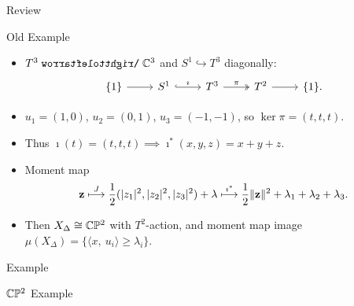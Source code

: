\begin{frame}[fragile]{Review}
    \begin{block}{Old Example}
        \begin{itemize}
            \item $T^{3} \acts \CC^{3}$ and $S^{1} \hookrightarrow T^{3}$ diagonally:
            \[
            \begin{tikzcd}
                \{1\} \arrow[r] & S^{1} \arrow[r, "\imath", hook] & T^{3} \arrow[r, "\pi", two heads] & T^{2} \arrow[r] & \{1\}.
            \end{tikzcd}
            \]
            \item $u_{1} = (1,0)$, $u_{2} = (0,1)$, $u_{3} = (-1,-1)$, so $\ker \pi = (t,t,t)$. 
            \item Thus $\imath(t) = (t,t,t) \implies \imath^{\ast}(x,y,z) = x + y + z$.
            \item Moment map
            $$ \vb{z} \overset{J}{\longmapsto} \frac{1}{2}( |z_{1}|^{2}, |z_{2}|^{2}, |z_{3}|^{2} ) + \vb{\lambda} \overset{\imath^{\ast}}{\longmapsto} \frac{1}{2} \| \vb{z} \|^{2} + \lambda_{1} + \lambda_{2} + \lambda_{3}. $$
            \item Then $X_{\Delta} \cong \mathbb{C}\mathbb{P}^{2}$ with $T^{2}$-action, and moment map image $\mu(X_{\Delta}) = \{ \langle x,\ u_{i} \rangle \geq \lambda_{i} \}$.
        \end{itemize}
    \end{block}
\end{frame}

\begin{frame}{Example}
    \begin{block}{$\mathbb{C}\mathbb{P}^{2}$ Example}
        \vspace{192pt}
    \end{block}
\end{frame}

